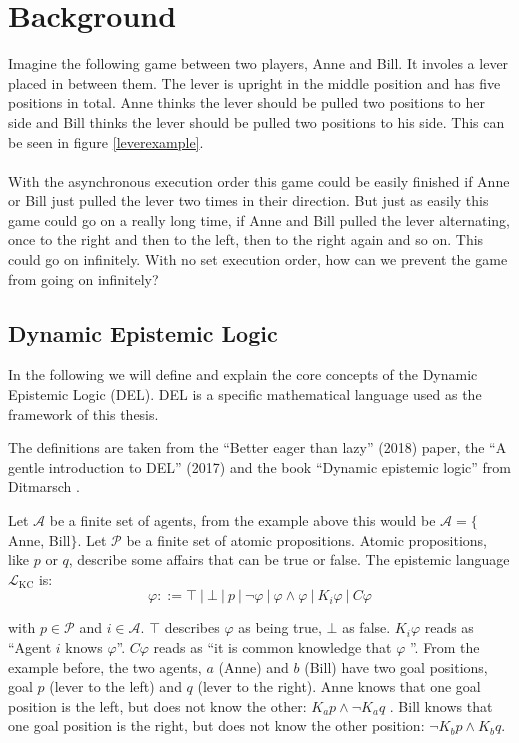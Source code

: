 \chapter{Background}\label{chap:background}

Imagine the following game between two players, Anne and Bill. It  involes a lever placed in between them. The lever is upright in the middle position and has five positions in total. Anne thinks the lever should be pulled two positions to her side and Bill thinks the lever should be pulled two positions to his side. This can be seen in figure \ref{leverexample}.\\
 \\
With the asynchronous execution order this game could be easily finished if Anne or Bill just pulled the lever two times in their direction. But just as easily this game could go on a really long time, if Anne and Bill pulled the lever alternating, once to the right and then to the left, then to the right again and so on. This could go on infinitely. With no set execution order, how can we prevent the game from going on infinitely?

\section{Dynamic Epistemic Logic}
In the following we will define and explain the core concepts of the Dynamic Epistemic Logic (DEL). DEL is a specific mathematical language used as the framework of this thesis.

The definitions are taken from the ``Better eager than lazy'' (2018) \cite{bolander2018better} paper, the ``A gentle introduction to DEL'' (2017) \cite{bolander2017gentle} and the book ``Dynamic epistemic logic'' from Ditmarsch \cite{Ditmarsch2007}.

Let $\mathcal{A}$ be a finite set of agents, from the example above this would be $\mathcal{A} =\{$Anne, Bill$\}$. Let $\mathcal{P}$ be a finite set of atomic propositions. Atomic propositions, like $p$ or $q$, describe some affairs that can be true or false.
The epistemic language $\mathcal{L}_{\text{KC}}$ is: \\
$$
\varphi ::= \top \ | \ \bot \ | \ p \ | \ \neg \varphi \ | \ \varphi \wedge \varphi \ | \ K_i \varphi \ | \ C\varphi
$$

with $p \in \mathcal{P}$ and $i \in \mathcal{A}$.
$\top$ describes $\varphi$ as being true, $\bot$ as false.
$K_i \varphi$ reads as ``Agent $i$ knows $\varphi$''. $C \varphi$ reads as ``it is common knowledge that $\varphi$ ''.
From the example before, the two agents, $a$ (Anne) and $b$ (Bill) have two goal positions, goal $p$ (lever to the left) and $q$ (lever to the right). Anne knows that one goal position is the left, but does not know the other: $K_a p \wedge \neg K_a q$ . Bill knows that one goal position is the right, but does not know the other position: $\neg K_b  p \wedge K_b q$.


